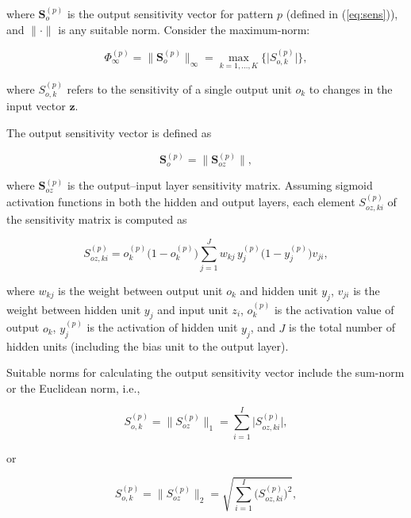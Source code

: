 \documentclass[10pt, conference]{IEEEtran}
\begin{document}
where $\mathbf{S}_o^{(p)}$ is the output sensitivity vector for pattern $p$ (defined in (\ref{eq:sens})), and $\lVert \cdot \rVert$ is any suitable norm.  
Consider the maximum-norm:

\begin{equation}
	\Phi_{\infty}^(p) = \lVert \mathbf{S}_o^{(p)} \rVert_\infty 
	= \max_{k=1,\dots,K} \{ \big| S_{o,k}^{(p)} \big| \},
	\label{eq:mn}
\end{equation}

where $S_{o,k}^{(p)}$ refers to the sensitivity of a single output unit $o_k$ to changes in the input vector $\mathbf{z}$.  

The output sensitivity vector is defined as

\begin{equation}
	\mathbf{S}_o^{(p)} = \lVert \mathbf{S}_{oz}^{(p)} \rVert,
	\label{eq:sens}
\end{equation}

where $\mathbf{S}_{oz}^{(p)}$ is the output--input layer sensitivity matrix. Assuming sigmoid activation functions in both the hidden and output layers, each element $S_{oz,ki}^{(p)}$ of the sensitivity matrix is computed as

\begin{equation}
	S_{oz,ki}^{(p)} = o_k^{(p)} \big(1 - o_k^{(p)}\big) 
	\sum_{j=1}^{J} w_{kj} \, y_j^{(p)}\big(1 - y_j^{(p)}\big) v_{ji},
	\label{eq:sens_mat}
\end{equation}

where $w_{kj}$ is the weight between output unit $o_k$ and hidden unit $y_j$, $v_{ji}$ is the weight between hidden unit $y_j$ and input unit $z_i$, $o_k^{(p)}$ is the activation value of output $o_k$, $y_j^{(p)}$ is the activation of hidden unit $y_j$, and $J$ is the total number of hidden units (including the bias unit to the output layer).  

Suitable norms for calculating the output sensitivity vector include the sum-norm or the Euclidean norm, i.e.,

\begin{equation}
	S_{o,k}^{(p)} = \lVert {S}_{oz}^{(p)} \rVert_1 
	= \sum_{i=1}^{I} \big| S_{oz,ki}^{(p)} \big|,
\end{equation}

or

\begin{equation}
	S_{o,k}^{(p)} = \lVert {S}_{oz}^{(p)} \rVert_2 
	= \sqrt{ \sum_{i=1}^{I} \big( S_{oz,ki}^{(p)} \big)^2 },
\end{equation}
\end{document}
